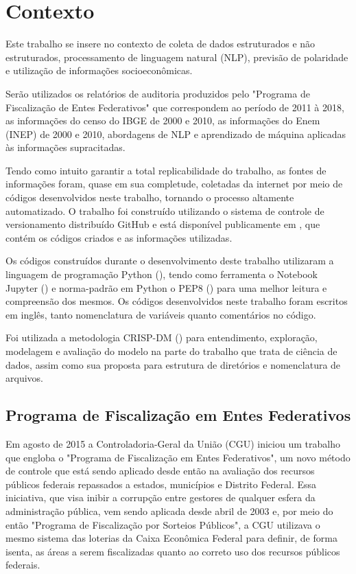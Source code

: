 \chapter{Contexto}
\label{cap:contexto}

Este trabalho se insere no contexto de coleta de dados estruturados e não estruturados, processamento de linguagem natural (NLP), previsão de polaridade e utilização de informações socioeconômicas.

Serão utilizados os relatórios de auditoria produzidos pelo "Programa de Fiscalização de Entes Federativos" que correspondem ao período de 2011 à 2018, as informações do censo do IBGE de 2000 e 2010, as informações do Enem (INEP) de 2000 e 2010, abordagens de NLP e aprendizado de máquina aplicadas às informações supracitadas.

Tendo como intuito garantir a total replicabilidade do trabalho, as fontes de informações foram, quase em sua completude, coletadas da internet por meio de códigos desenvolvidos neste trabalho, tornando o processo altamente automatizado. O trabalho foi construído utilizando o sistema de controle de versionamento distribuído GitHub e está disponível publicamente em \citet{GitHubLucas}, que contém os códigos criados e as informações utilizadas.

Os códigos construídos durante o desenvolvimento deste trabalho utilizaram a linguagem de programação Python (\citet{Python}), tendo como ferramenta o Notebook Jupyter (\citet{JupyterNotebook}) e norma-padrão em Python o PEP8 (\citet{PEP8}) para uma melhor leitura e compreensão dos mesmos. Os códigos desenvolvidos neste trabalho foram escritos em inglês, tanto nomenclatura de variáveis quanto comentários no código.

Foi utilizada a metodologia CRISP-DM (\citet{CRISPDM}) para entendimento, exploração, modelagem e avaliação do modelo na parte do trabalho que trata de ciência de dados, assim como sua proposta para estrutura de diretórios e nomenclatura de arquivos.

\section{Programa de Fiscalização em Entes Federativos}
\label{sec:programa_de_fiscalizacao_em_entes_federativos}

Em agosto de 2015 a Controladoria-Geral da União (CGU) iniciou um trabalho que engloba o "Programa de Fiscalização em Entes Federativos", um novo método de controle que está sendo aplicado desde então na avaliação dos recursos públicos federais repassados a estados, municípios e Distrito Federal. Essa iniciativa, que visa inibir a corrupção entre gestores de qualquer esfera da administração pública, vem sendo aplicada desde abril de 2003 e, por meio do então "Programa de Fiscalização por Sorteios Públicos", a CGU utilizava o mesmo sistema das loterias da Caixa Econômica Federal para definir, de forma isenta, as áreas a serem fiscalizadas quanto ao correto uso dos recursos públicos federais.

